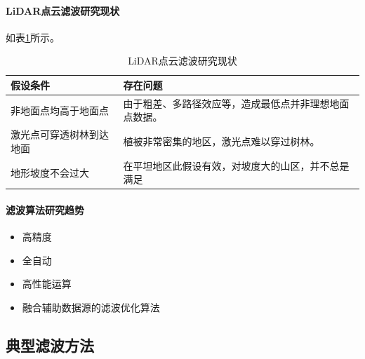\paragraph{LiDAR点云滤波研究现状}如表\ref{tab:LiDAR点云滤波研究现状}所示。
\begin{table}[htbp]
	\centering
	\caption{LiDAR点云滤波研究现状}
	\label{tab:LiDAR点云滤波研究现状}
	\begin{tabular}{|l|l|}
		\hline
		假设条件         & 存在问题                        \\ \hline
		非地面点均高于地面点   & 由于粗差、多路径效应等，造成最低点并非理想地面点数据。 \\ \hline
		激光点可穿透树林到达地面 & 植被非常密集的地区，激光点难以穿过树林。        \\ \hline
		地形坡度不会过大     & 在平坦地区此假设有效，对坡度大的山区，并不总是满足   \\ \hline
	\end{tabular}
\end{table}

\paragraph{滤波算法研究趋势}
\begin{itemize}
	\item 高精度
	\item 全自动
	\item 高性能运算
	\item 融合辅助数据源的滤波优化算法
\end{itemize}

\subsection{典型滤波方法}

